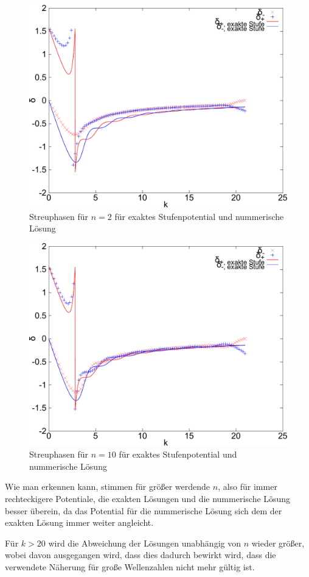 \begin{figure}[htb]
  \centering
  \includegraphics[width=0.75\columnwidth,keepaspectratio]{../tmp/71a_n2-crop}
  \caption{Streuphasen für $n=2$ für exaktes Stufenpotential und nummerische Lösung}
  \label{fig:n2}
\end{figure}

\begin{figure}[htb]
  \centering
  \includegraphics[width=0.75\columnwidth,keepaspectratio]{../tmp/71a_n10-crop}
  \caption{Streuphasen für $n=10$ für exaktes Stufenpotential und nummerische Lösung}
  \label{fig:n10}
\end{figure}

Wie man erkennen kann, stimmen für größer werdende $n$, also für immer rechteckigere
Potentiale, die exakten Lösungen und die nummerische Lösung besser überein, da
das Potential für die nummerische Lösung sich dem der exakten Lösung immer weiter angleicht.

Für $k>20$ wird die Abweichung der Lösungen unabhängig von $n$ wieder größer, wobei
davon ausgegangen wird, dass dies dadurch bewirkt wird, dass die verwendete
Näherung für große Wellenzahlen nicht mehr gültig ist.


